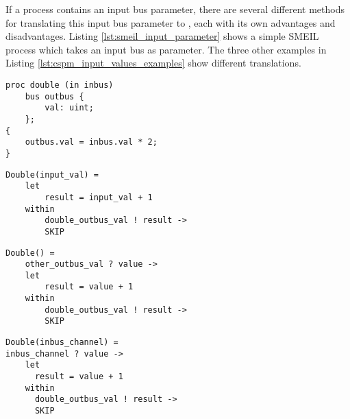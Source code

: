 If a process contains an input bus parameter, there are several different methods for translating this input bus parameter to \cspm{}, each with its own advantages and disadvantages.
Listing \ref{lst:smeil_input_parameter} shows a simple SMEIL process which takes an input bus as parameter. The three other examples in Listing \ref{lst:cspm_input_values_examples} show different translations.\\
\begin{minipage}[t]{.98\linewidth}
    \centering
\begin{minipage}[t]{0.45\linewidth}
  \begin{verbatim}
proc double (in inbus)
    bus outbus {
        val: uint;
    };
{
    outbus.val = inbus.val * 2;
}
  \end{verbatim}
  \label{lst:smeil_input_parameter}
\end{minipage}
\hspace{0.6cm}
\begin{minipage}[t]{0.45\linewidth}
\begin{verbatim}
Double(input_val) =
    let
        result = input_val + 1
    within
        double_outbus_val ! result ->
        SKIP

\end{verbatim}
\label{lst:cspm_input_value}
\end{minipage}
\hspace{0.6cm}
\newline
\begin{minipage}[t]{0.45\linewidth}
\begin{verbatim}
Double() =
    other_outbus_val ? value ->
    let
        result = value + 1
    within
        double_outbus_val ! result ->
        SKIP
\end{verbatim}
\label{lst:cspm_no_input}
\end{minipage}
\hspace{0.6cm}
\begin{minipage}[t]{0.45\linewidth}
\begin{verbatim}
Double(inbus_channel) =
inbus_channel ? value ->
    let
      result = value + 1
    within
      double_outbus_val ! result ->
      SKIP
\end{verbatim}
\label{lst:cspm_channel_reads_input}
\end{minipage}
\vspace{0.3cm}
\label{lst:cspm_input_values_examples}
\vspace{1cm}
\end{minipage}

